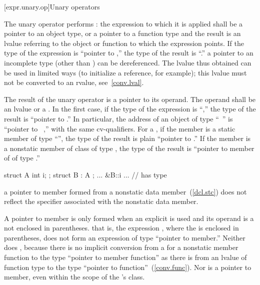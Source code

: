 [expr.unary.op]{Unary operators}

\pnum
{}%
%
The unary \tcode{*} operator performs :
%
%
the expression to which it is applied shall be a pointer to an object
type, or a pointer to a function type and the result is an lvalue
referring to the object or function to which the expression points. If
the type of the expression is ``pointer to ,'' the type of the
result is ``.''
\enternote 
{}%
a pointer to an incomplete type (other than  )
can be dereferenced. The lvalue thus obtained can be used in limited
ways (to initialize a reference, for example); this lvalue must not be
converted to an rvalue, see~\ref{conv.lval}.
\exitnote 

\pnum
{}%
%
The result of the unary \tcode{\&} operator is a pointer to its operand.
The operand shall be an lvalue or a .
In the first case, if the type of the expression is ``,'' the
type of the result is ``pointer to .'' In particular, the
address of an object of type ``\cv\ '' is ``pointer
to \cv\ ,'' with the same cv-qualifiers. For a
, if the member is a static member of type
``'', the type of the result is plain ``pointer to .''
If the member is a nonstatic member of class  of type ,
the type of the result is ``pointer to member of  of
type .''
\enterexample 

\begin{codeblock}
struct A { int i; };
struct B : A { };
... &B::i ...			// has type 
\end{codeblock}
\exitexampleb 
\enternote 
a pointer to member formed from a  nonstatic data
member~(\ref{dcl.stc}) does not reflect the  specifier
associated with the nonstatic data member.
\exitnote 

\pnum
A pointer to member is only formed when an explicit \tcode{\&} is used
and its operand is a  not enclosed in
parentheses.
\enternote 
that is, the expression , where the
 is enclosed in parentheses, does not form an
expression of type ``pointer to member.'' Neither does
, because there is no implicit conversion from a
 for a nonstatic member function to the type
``pointer to member function'' as there is from an lvalue of function
type to the type ``pointer to function''~(\ref{conv.func}). Nor is
 a pointer to member, even within the scope of
the 's class.
\exitnote 

